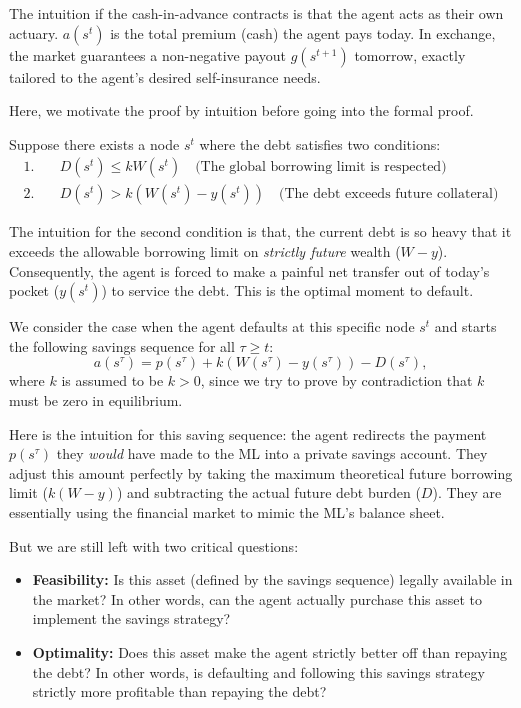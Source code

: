 The intuition if the cash-in-advance contracts is that the agent acts as their own actuary. $a(s^t)$ is the total premium (cash) the agent pays today. In exchange, the market guarantees a non-negative payout $g(s^{t+1})$ tomorrow, exactly tailored to the agent's desired self-insurance needs.


Here, we motivate the proof by intuition before going into the formal proof. 

Suppose there exists a node $s^t$ where the debt satisfies two conditions:
\[
\begin{aligned}
    1. \quad & D(s^t) \le k W(s^t) \quad \text{(The global borrowing limit is respected)}\\
    2. \quad & D(s^t) > k\left(W(s^t) - y(s^t)\right) \quad \text{(The debt exceeds future collateral)}
\end{aligned}
\]

The intuition for the second condition is that, the current debt is so heavy that it exceeds the allowable borrowing limit on \textit{strictly future} wealth ($W - y$). Consequently, the agent is forced to make a painful net transfer out of today's pocket ($y(s^t)$) to service the debt. This is the optimal moment to default.

We consider the case when the agent defaults at this specific node $s^t$ and starts the following savings sequence for all $\tau \ge t$:
\[
a(s^{\tau}) = p(s^{\tau}) + k\left(W(s^{\tau}) - y(s^{\tau})\right) - D(s^{\tau}),
\]
where $k$ is assumed to be $k>0$, since we try to prove by contradiction that $k$ must be zero in equilibrium.

Here is the intuition for this saving sequence: the agent redirects the payment $p(s^{\tau})$ they \textit{would} have made to the ML into a private savings account. They adjust this amount perfectly by taking the maximum theoretical future borrowing limit ($k(W-y)$) and subtracting the actual future debt burden ($D$). They are essentially using the financial market to mimic the ML's balance sheet.

But we are still left with two critical questions:
\begin{itemize}
    \item \textbf{Feasibility:} Is this asset (defined by the savings sequence) legally available in the market? In other words, can the agent actually purchase this asset to implement the savings strategy?
    \item \textbf{Optimality:} Does this asset make the agent strictly better off than repaying the debt? In other words, is defaulting and following this savings strategy strictly more profitable than repaying the debt?
\end{itemize}

